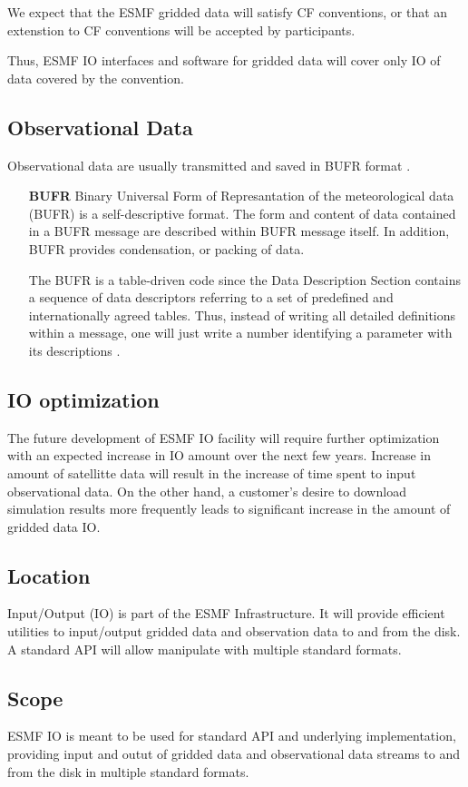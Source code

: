 We expect that the ESMF gridded data will satisfy CF conventions, or
that an extenstion to CF conventions will be accepted by participants.

Thus, ESMF IO interfaces and software for gridded data will cover only
IO of data covered by the convention.

\subsection{Observational Data}

Observational data are usually transmitted and saved in BUFR format 
\cite{WMO-BUFR-CREX}. 

\begin{itemize}
\item[\bf BUFR] Binary Universal Form of Represantation
of the meteorological data (BUFR) is a self-descriptive format. The
form and content of data contained in a BUFR message are described
within BUFR message itself. In addition, BUFR provides condensation,
or packing of data. 

The BUFR is a table-driven code since the Data Description Section
contains a sequence of data descriptors referring to a set of predefined and 
internationally agreed tables. Thus, instead of writing all detailed
definitions within a message, one will just write a number identifying
a parameter with its descriptions \cite{WMO-BUFR-CREX}.
\end{itemize}

\subsection{IO optimization}

The future development of ESMF IO facility will require further
optimization with an expected increase in IO amount over the next few
years. Increase in amount of satellitte data will result in the
increase of time spent to input observational data. On the other hand,
a customer's desire to download simulation results more frequently leads
to significant increase in the amount of gridded data IO.



\subsection{Location}

Input/Output (IO) is part of the ESMF Infrastructure.  It will provide
efficient utilities to input/output gridded data and observation data
to and from the disk. A standard API will allow manipulate with multiple
standard formats.

\subsection{Scope}

ESMF IO is meant to be used for standard API and underlying
implementation, providing input and outut of gridded data and
observational data streams to and from the disk in multiple standard
formats.














